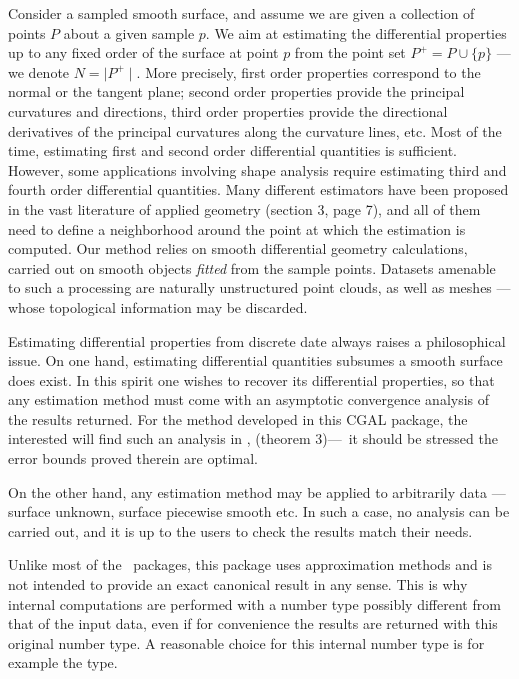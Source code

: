 Consider a sampled smooth surface, and assume we are given a
collection of points $P$ about a given sample $p$. We aim at
estimating the differential properties up to any fixed order of the
surface at point $p$ from the point set $P^+ = P\cup \{ p\}$ --- we
denote $N=\mid P^+\mid$. More precisely, first order properties
correspond to the normal or the tangent plane; second order properties
provide the principal curvatures and directions, third order
properties provide the directional derivatives of the principal
curvatures along the curvature lines, etc.  Most of the time,
estimating first and second order differential quantities is
sufficient.  However, some applications involving shape analysis
require estimating third and fourth order differential quantities.
Many different estimators have been proposed in the vast literature of
applied geometry \cite{cgal:p-smrqt-01} (section 3, page 7), and all
of them need to define a neighborhood around the point at which the
estimation is computed.  Our method relies on smooth differential
geometry calculations, carried out on smooth objects {\em fitted} from
the sample points. 
Datasets amenable to such a processing are naturally unstructured
point clouds, as well as meshes ---whose topological information may
be discarded.

Estimating differential properties from discrete date always raises a
philosophical issue.
On one hand, estimating differential quantities subsumes a smooth
surface does exist.
In this spirit one wishes to recover its differential
properties, so that any estimation method must come with an
asymptotic convergence analysis of the results returned. For the
method developed in this CGAL package, the
interested will find such an analysis in
\cite{cgal:cp-edqpf-05}, (theorem 3)---\ it should be stressed 
the error bounds proved therein are optimal.

On the other hand, any estimation method may be applied to arbitrarily
data ---surface unknown, surface piecewise smooth etc. In such a case,
no analysis can be carried out, and it is up to the users to check the
results match their needs.


Unlike most of the \cgal\ packages, this package uses approximation
methods and is not intended to provide an exact canonical result in
any sense. This is why internal computations are performed with a
number type possibly different from that of the input data, even if
for convenience the results are returned with this original number
type. A reasonable choice for this internal number type is for example
the  type.

